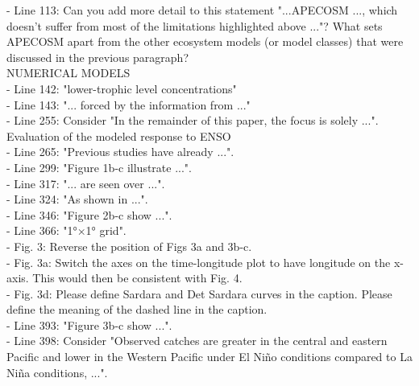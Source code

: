 \documentclass{article}
\begin{document}
- Line 113: Can you add more detail to this statement "...APECOSM ..., which doesn't suffer from most of the limitations highlighted above ..."? What sets APECOSM apart from the other ecosystem models (or model classes) that were discussed in the previous paragraph?\\


NUMERICAL MODELS\\

- Line 142: "lower-trophic level concentrations"\\

- Line 143: "... forced by the information from ..."\\

- Line 255: Consider "In the remainder of this paper, the focus is solely ...".\\

Evaluation of the modeled response to ENSO\\
- Line 265: "Previous studies have already ...".\\

- Line 299: "Figure 1b-c illustrate ...".\\

- Line 317: "... are seen over ...".\\

- Line 324: "As shown in ...".\\

- Line 346: "Figure 2b-c show ...".\\

- Line 366: "1°×1° grid".\\

- Fig. 3: Reverse the position of Figs 3a and 3b-c.\\

- Fig. 3a: Switch the axes on the time-longitude plot to have longitude on the x-axis. This would then be consistent with Fig. 4.\\

- Fig. 3d: Please define Sardara and Det Sardara curves in the caption. Please define the meaning of the dashed line in the caption.\\

- Line 393: "Figure 3b-c show ...".\\

- Line 398: Consider "Observed catches are greater in the central and eastern Pacific and lower in the Western Pacific under El Niño conditions compared to La Niña conditions, ...".\\
\end{document}
